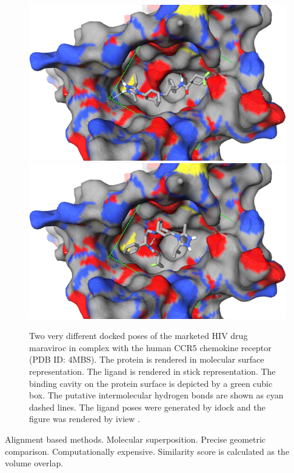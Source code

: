\documentclass[twocolumn]{svjour3}          %
\begin{document}
\begin{figure}
\centering
\includegraphics[width=1.36\textwidth,natwidth=638,natheight=386]{../usrt/MRV0.png}
\endminipage
{}
\centering
\includegraphics[width=1.36\textwidth,natwidth=638,natheight=386]{../usrt/MRV1.png}
\endminipage
\caption{Two very different docked poses of the marketed HIV drug maraviroc in complex with the human CCR5 chemokine receptor (PDB ID: 4MBS). The protein is rendered in molecular surface representation. The ligand is rendered in stick representation. The binding cavity on the protein surface is depicted by a green cubic box. The putative intermolecular hydrogen bonds are shown as cyan dashed lines. The ligand poses were generated by idock \cite{1153} and the figure was rendered by iview \cite{1366}.}
\label{fig:MRV}
\end{figure}

Alignment based methods. Molecular superposition. Precise geometric comparison. Computationally expensive. Similarity score is calculated as the volume overlap.
\end{document}
